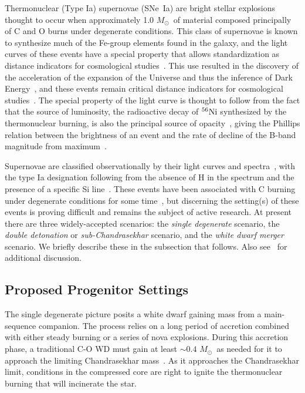 \documentclass[preprint2]{aastex63}
\newcommand{\SNeIa}{SNe~Ia}
\newcommand{\Ni}[1]{\ensuremath{{}^{#1}{\rm Ni}}}
\newcommand{\Msun}{\ensuremath{M_\odot}}
\begin{document}
Thermonuclear (Type Ia) supernovae (\SNeIa) are bright stellar explosions
thought to occur when approximately 1.0 \Msun\ of material composed principally
of C and O burns under degenerate conditions. This class of supernovae is
known to synthesize much of the Fe-group elements found in the galaxy, and
the light curves of these events have a special property that allows
standardization
as distance indicators for cosmological studies~\citep{phillips:absolute}.
This use resulted in the discovery of the acceleration of the expansion of
the Universe and thus the inference of Dark
Energy~\citep{riess.filippenko.ea:observational,
perlmutter.aldering.ea:measurements,leibundgut2001}, and these events
remain critical distance indicators for cosmological studies~\citep{weinbergetal2013}.
The special property of the light curve is thought to follow
from the fact that the source of luminosity, the radioactive decay
of \Ni{56} synthesized by the thermonuclear burning, is also the
principal source of opacity~\citep{Pinto2001The-type-Ia-sup}, giving
the Phillips relation between the brightness of an event and the
rate of decline of the B-band magnitude from maximum~\citep{phillips:absolute}.

Supernovae are classified observationally
by their light curves and spectra~\citep{minkowski41,bertola64,porterfilippenko87,
wheelerharkness1990conf,Fili97}, with the type Ia designation following from
the absence of H in the spectrum and the presence of a specific Si
line~\citep{filippenko:optical,hillebrandt.niemeyer:type}. These events
have been associated with C burning under degenerate conditions
for some time~\citep{hoylefowler60,arnett.truran.ea:nucleosynthesis},
but discerning the setting(s) of these events is proving difficult
and remains the subject of active research. At present there are three
widely-accepted scenarios: the {\em single degenerate} scenario,
the {\em double detonation} or {\em sub-Chandrasekhar} scenario, and
the {\em white dwarf merger} scenario.
We briefly describe these in the subsection that follows.
Also see~\citet{hillebrandt.niemeyer:type,howell2011,hillebrandtetal2013,calderetal2013,SeitenzahlTownsley2017,roepkesim2018}
for additional discussion.

\subsection{Proposed Progenitor Settings}\label{sec:progenitors}

The single degenerate picture posits a white dwarf gaining mass
from a main-sequence companion. The process relies on a long
period of accretion combined with either steady burning or a
series of nova explosions. During this accretion phase, a traditional
C-O WD must gain at least
$\sim 0.4$ \Msun\ as needed for it to approach the
limiting Chandrasekhar mass~\citep{starrfieldetal2012}. As it approaches
the Chandrasekhar limit, conditions in the compressed core are right
to ignite the thermonuclear burning that will incinerate the star.
\end{document}
